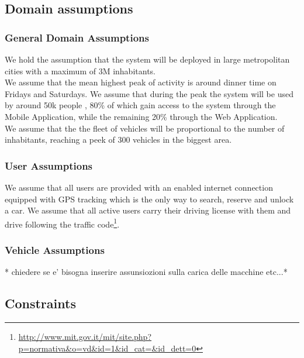 \documentclass[12pt]{article}
\begin{document}
	\subsection{Domain assumptions}
		
		
		\subsubsection{General Domain Assumptions}
			We hold the assumption that the system will be deployed in large metropolitan 
			cities with a maximum of 3M inhabitants.\\
			We assume that the mean highest peak of activity is around dinner time on Fridays 
			and Saturdays. We assume that during the peak the system will be used by around 50k 
			people , 80\% of which gain access to the system through the Mobile Application, 
			while the remaining 20\% through the Web Application.\\
			We assume that the the fleet of vehicles will be proportional to the number of 
			inhabitants, reaching a peek of 300 vehicles in the biggest area.\\
			
		\subsubsection{User Assumptions}
			We assume that all users are provided with an enabled internet connection equipped 	
			with GPS tracking which is the only way to search, reserve and unlock a car.
			We assume that all active users carry their driving license with them and drive 
			following the traffic code\footnote{\url {http://www.mit.gov.it/mit/site.php?
			p=normativa&o=vd&id=1&id_cat=&id_dett=0}}.

		\subsubsection{Vehicle Assumptions}
		* chiedere se e' bisogna inserire assunsiozioni sulla carica delle macchine etc...*		
	
	
	\subsection{Constraints}
	
\end{document}
